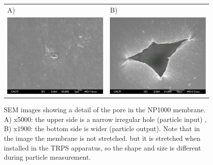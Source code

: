 \documentclass[journal=langd5,manuscript=article]{achemso}
\begin{document}
\begin{figure}
\begin{tabular}{|l|l|}
\hline
A) & B) \\
\includegraphics[width=0.5\linewidth]{Figures/NP1000-016.jpg}  &
\includegraphics[width=0.5\linewidth]{Figures/NP1000-021.jpg}  \\
\hline
\end{tabular}
\caption{SEM images showing a detail of the pore in the NP1000 membrane. A) x5000: the upper side is a narrow irregular hole (particle input) , B) x1900: the bottom side is wider (particle output). Note that in the image the membrane is not stretched. but it is stretched when installed in the TRPS apparatus, so the shape and size is different during particle measurement.}
\label{fgr:NPmil}
\end{figure}
\end{document}
